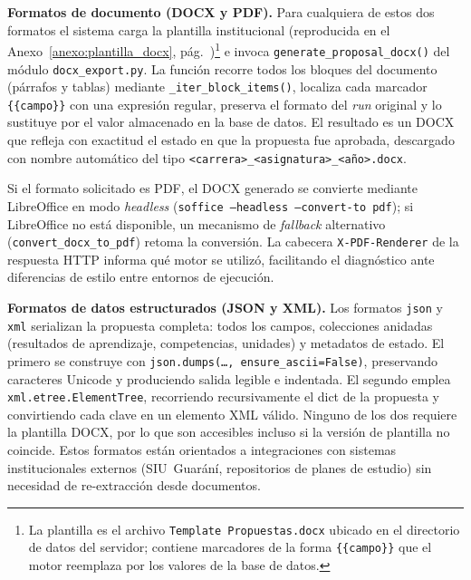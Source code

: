 \medskip
\noindent\textbf{Formatos de documento (DOCX y PDF).}
Para cualquiera de estos dos formatos el sistema carga la plantilla
institucional (reproducida en el Anexo~\ref{anexo:plantilla_docx},
p\'{a}g.~\pageref{anexo:plantilla_docx})\footnote{La plantilla es el archivo
\texttt{Template\,Propuestas.docx} ubicado en el directorio de datos del
servidor; contiene marcadores de la forma \texttt{\{\{campo\}\}} que el
motor reemplaza por los valores de la base de datos.}
e invoca \texttt{generate\_proposal\_\allowbreak docx()} del m\'{o}dulo
\texttt{docx\_export.py}.
La funci\'{o}n recorre todos los bloques del documento (p\'{a}rrafos y
tablas) mediante \texttt{\_iter\_block\_\allowbreak items()}, localiza cada marcador
\texttt{\{\{campo\}\}} con una expresi\'{o}n regular, preserva el formato
del \textit{run} original y lo sustituye por el valor almacenado en la
base de datos.
El resultado es un DOCX que refleja con exactitud el estado en que la propuesta fue
aprobada, descargado con nombre autom\'{a}tico del tipo
\mbox{\texttt{<carrera>\_<asignatura>\_<a\~{n}o>.docx}}.

Si el formato solicitado es PDF, el DOCX generado se convierte mediante
LibreOffice en modo \textit{headless} (\texttt{soffice --headless
--convert-to pdf}); si LibreOffice no est\'{a} disponible, un mecanismo de
\textit{fallback} alternativo (\texttt{convert\_docx\_to\_pdf}) retoma la
conversi\'{o}n.
La cabecera \texttt{X-PDF-Renderer} de la respuesta HTTP informa qu\'{e}
motor se utiliz\'{o}, facilitando el diagn\'{o}stico ante diferencias de
estilo entre entornos de ejecuci\'{o}n.

\medskip
\noindent\textbf{Formatos de datos estructurados (JSON y XML).}
Los formatos \texttt{json} y \texttt{xml} serializan la propuesta completa:
todos los campos, colecciones anidadas (resultados de aprendizaje,
competencias, unidades) y metadatos de estado.
El primero se construye con \texttt{json.dumps(\ldots,\allowbreak~ensure\_ascii=False)},
preservando caracteres Unicode y produciendo salida legible e
indentada.
El segundo emplea \texttt{xml.etree.ElementTree}, recorriendo
recursivamente el dict de la propuesta y convirtiendo cada clave en
un elemento XML v\'{a}lido.
Ninguno de los dos requiere la plantilla DOCX, por lo que son accesibles
incluso si la versi\'{o}n de plantilla no coincide.
Estos formatos est\'{a}n orientados a integraciones con sistemas
institucionales externos (SIU~Guar\'{a}n\'{i}, repositorios de planes de
estudio) sin necesidad de re-extracci\'{o}n desde documentos.

